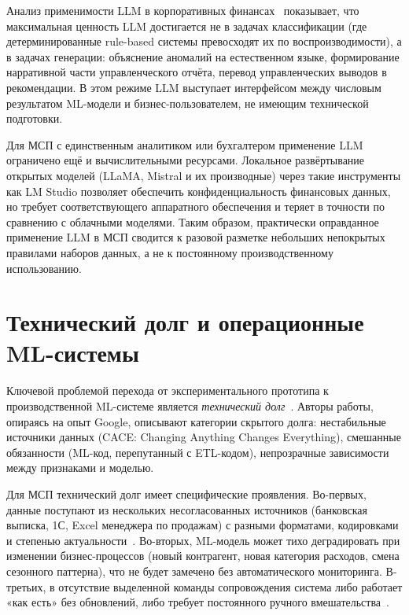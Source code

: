 Анализ применимости LLM в корпоративных финансах~\cite{lopezdeprado2018advances} показывает, что максимальная ценность LLM достигается не в задачах классификации (где детерминированные rule-based системы превосходят их по воспроизводимости), а в задачах генерации: объяснение аномалий на естественном языке, формирование нарративной части управленческого отчёта, перевод управленческих выводов в рекомендации. В этом режиме LLM выступает интерфейсом между числовым результатом ML-модели и бизнес-пользователем, не имеющим технической подготовки.

Для МСП с единственным аналитиком или бухгалтером применение LLM ограничено ещё и вычислительными ресурсами. Локальное развёртывание открытых моделей (LLaMA, Mistral и их производные) через такие инструменты как LM Studio позволяет обеспечить конфиденциальность финансовых данных, но требует соответствующего аппаратного обеспечения и теряет в точности по сравнению с облачными моделями. Таким образом, практически оправданное применение LLM в МСП сводится к разовой разметке небольших непокрытых правилами наборов данных, а не к постоянному производственному использованию.

\section{Технический долг и операционные ML-системы}

Ключевой проблемой перехода от экспериментального прототипа к производственной ML-системе является \textit{технический долг}~\cite{sculley2015hidden}. Авторы работы, опираясь на опыт Google, описывают категории скрытого долга: нестабильные источники данных (CACE: Changing Anything Changes Everything), смешанные обязанности (ML-код, перепутанный с ETL-кодом), непрозрачные зависимости между признаками и моделью.

Для МСП технический долг имеет специфические проявления. Во-первых, данные поступают из нескольких несогласованных источников (банковская выписка, 1С, Excel менеджера по продажам) с разными форматами, кодировками и степенью актуальности~\cite{whittington2012principles}. Во-вторых, ML-модель может тихо деградировать при изменении бизнес-процессов (новый контрагент, новая категория расходов, смена сезонного паттерна), что не будет замечено без автоматического мониторинга. В-третьих, в отсутствие выделенной команды сопровождения система либо работает «как есть» без обновлений, либо требует постоянного ручного вмешательства~\cite{sculley2015hidden}.

